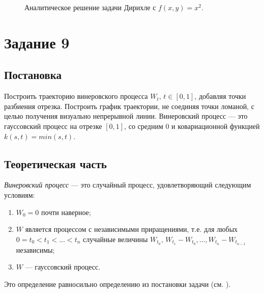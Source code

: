 \documentclass[12pt, a4paper]{article}
\begin{document}
\begin{figure}[H]
\begin{center}
\end{center}
\caption{Аналитическое решение задачи Дирихле с $f(x,y)=x^2$.}
\end{figure}

\newpage

\section{Задание 9}
\subsection{Постановка}
Построить траекторию винеровского процесса $W_t,\,t\in[0,1]$, добавляя точки разбиения отрезка. Построить график траектории, не соединяя точки ломаной, с целью получения визуально непрерывной линии. Винеровский процесс --- это гауссовский процесс на отрезке $[0,1]$, со средним $0$ и ковариационной функцией $k(s,t) = min(s,t)$.

\subsection{Теоретическая часть}
\begin{df}
	\textit{Винеровский процесс} --- это случайный процесс, удовлетворяющий следующим условиям:
	\begin{enumerate}
		\item $W_0 = 0$ почти наверное;
		\item $W$ является процессом с независимыми приращениями, т.е. для любых $0=t_0<t_1<\dots<t_n$ случайные величины $W_{t_0},\,W_{t_1}-W_{t_0},\dots,W_{t_n}-W_{t_{n-1}}$ независимы;
		\item $W$ --- гауссовский процесс.
	\end{enumerate}
\end{df}

Это определение равносильно определению из постановки задачи (см. \cite{gihman_skorohod}).

\newpage
{}


\end{document}
